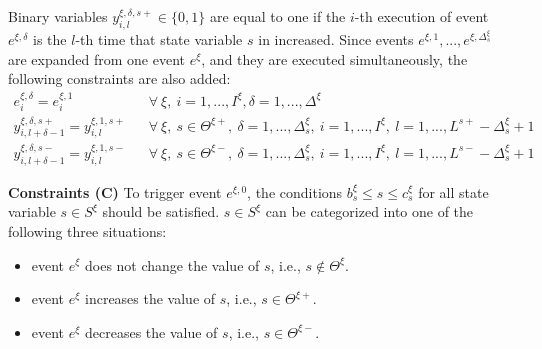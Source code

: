\documentclass[]{interact}
\theoremstyle{plain}%
\theoremstyle{definition}
\theoremstyle{remark}
\begin{document}
Binary variables $y^{\xi,\delta,s+}_{i,l}\in \{0,1\}$ are equal to one if the $i$-th execution of event $e^{\xi,\delta}$ is the $l$-th time that state variable $s$ in increased. Since events $e^{\xi,1},...,e^{\xi,\Delta^{\xi}_s}$ are expanded from one event $e^{\xi}$, and they are executed simultaneously, the following constraints are also added:
\begin{eqnarray}
e^{\xi,\delta}_i = e^{\xi,1}_i && \forall\ \xi,\ i=1,...,I^{\xi}, \delta=1,...,\Delta^{\xi}\\
y^{\xi,\delta,s+}_{i,l+\delta-1} = y^{\xi,1,s+}_{i,l} &&\forall\ \xi,\ s\in\Theta^{\xi+},\ \delta=1,...,\Delta^{\xi}_s,\ i=1,...,I^{\xi}, \ l=1,...,L^{s+}-\Delta^{\xi}_s+1\\
y^{\xi,\delta,s-}_{i,l+\delta-1} = y^{\xi,1,s-}_{i,l} &&\forall\ \xi,\ s\in\Theta^{\xi-},\ \delta=1,...,\Delta^{\xi}_s,\ i=1,...,I^{\xi}, \ l=1,...,L^{s-}-\Delta^{\xi}_s+1
\end{eqnarray}


\textbf{Constraints (C)} To trigger event $e^{\xi,0}$, the conditions $b^{\xi}_s\le s\le c^{\xi}_s$ for all state variable $s\in S^{\xi}$ should be satisfied. $s\in S^{\xi}$ can be categorized into one of the following three situations:
\begin{itemize}
	\item event $e^{\xi}$ does not change the value of $s$, i.e., $s\notin \Theta^{\xi}$.
	\item event $e^{\xi}$ increases the value of $s$, i.e., $s\in \Theta^{\xi+}$. 
	\item event $e^{\xi}$ decreases the value of $s$, i.e., $s\in \Theta^{\xi-}$. 
\end{itemize}
\end{document}
